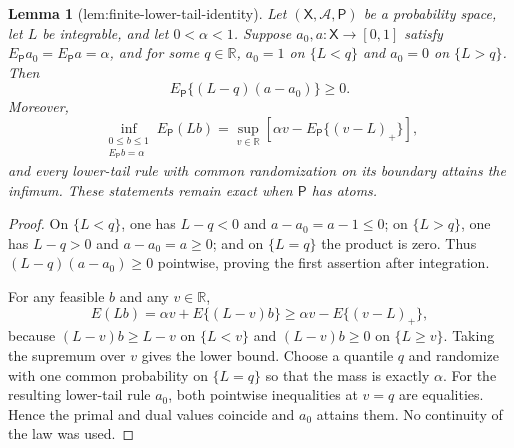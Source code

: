\documentclass{article}
\newtheorem{lemma}{Lemma}
\begin{document}
\begin{lemma}[lem:finite-lower-tail-identity]\label{lem:finite-lower-tail-identity}
Let \((\mathsf X,\mathscr A,\mathsf P)\) be a probability space, let \(L\) be integrable, and let \(0<\alpha<1\).  Suppose \(a_0,a:\mathsf X\to[0,1]\) satisfy \(E_{\mathsf P}a_0=E_{\mathsf P}a=\alpha\), and for some \(q\in\mathbb R\), \(a_0=1\) on \(\{L<q\}\) and \(a_0=0\) on \(\{L>q\}\).  Then
\[
 E_{\mathsf P}\{(L-q)(a-a_0)\}\geq0.
\]
Moreover,
\[
 \inf_{\substack{0\leq b\leq1\\E_{\mathsf P}b=\alpha}}E_{\mathsf P}(Lb)
 =\sup_{v\in\mathbb R}\left[\alpha v-E_{\mathsf P}\{(v-L)_+\}\right],
\]
and every lower-tail rule with common randomization on its boundary attains the infimum.  These statements remain exact when \(\mathsf P\) has atoms.
\end{lemma}
\begin{proof}
On \(\{L<q\}\), one has \(L-q<0\) and \(a-a_0=a-1\leq0\); on \(\{L>q\}\), one has \(L-q>0\) and \(a-a_0=a\geq0\); and on \(\{L=q\}\) the product is zero.  Thus \((L-q)(a-a_0)\geq0\) pointwise, proving the first assertion after integration.

For any feasible \(b\) and any \(v\in\mathbb R\),
\[
 E(Lb)=\alpha v+E\{(L-v)b\}
 \geq \alpha v-E\{(v-L)_+\},
\]
because \((L-v)b\geq L-v\) on \(\{L<v\}\) and \((L-v)b\geq0\) on \(\{L\geq v\}\).  Taking the supremum over \(v\) gives the lower bound.  Choose a quantile \(q\) and randomize with one common probability on \(\{L=q\}\) so that the mass is exactly \(\alpha\).  For the resulting lower-tail rule \(a_0\), both pointwise inequalities at \(v=q\) are equalities.  Hence the primal and dual values coincide and \(a_0\) attains them.  No continuity of the law was used.
\end{proof}
\end{document}
